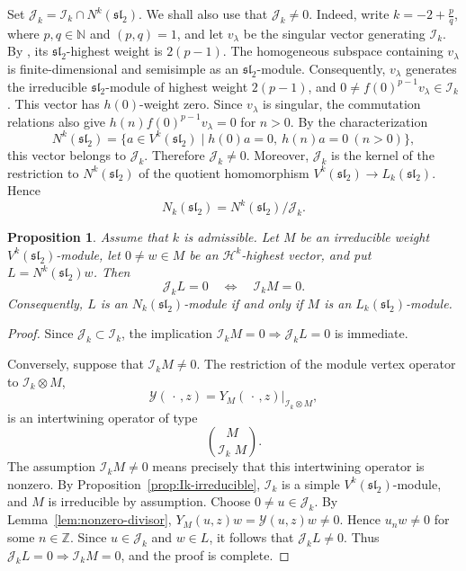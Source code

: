 \documentclass[11 pt]{amsart}
\newtheorem{proposition}{Proposition}
\theoremstyle{definition}
\theoremstyle{plain}
\begin{document}
Set $\mathcal J_k=\mathcal I_k\cap N^k(\mathfrak{sl}_2)$.
We shall also use that $\mathcal J_k\neq0$. Indeed, write
$k=-2+\frac{p}{q}$, where $p,q\in\mathbb N$ and $(p,q)=1$,
and let $v_\lambda$ be the singular vector generating $\mathcal I_k$. By
\cite[Theorem~5.3(1)]{AKMPP17}, its
$\mathfrak{sl}_2$-highest weight is $2(p-1)$. The homogeneous subspace
containing $v_\lambda$ is finite-dimensional and semisimple as an
$\mathfrak{sl}_2$-module. Consequently, $v_\lambda$ generates the
irreducible $\mathfrak{sl}_2$-module of highest weight $2(p-1)$, and
$0\neq f(0)^{p-1}v_\lambda\in\mathcal I_k$.
This vector has $h(0)$-weight zero. Since $v_\lambda$ is singular, the
commutation relations also give
$h(n)f(0)^{p-1}v_\lambda=0$ for $n>0$.
By the characterization
\[
  N^k(\mathfrak{sl}_2)
  =
  \{a\in V^k(\mathfrak{sl}_2)\mid
  h(0)a=0,\ h(n)a=0\ (n>0)\},
\]
this vector belongs to $\mathcal J_k$. Therefore $\mathcal J_k\neq0$.
Moreover, $\mathcal J_k$ is the kernel of the restriction to
$N^k(\mathfrak{sl}_2)$ of the quotient homomorphism
$V^k(\mathfrak{sl}_2)\to L_k(\mathfrak{sl}_2)$. Hence
\[
  N_k(\mathfrak{sl}_2)=N^k(\mathfrak{sl}_2)/\mathcal J_k.
\]

\par\medskip
\begin{proposition}\label{prop:factorization-criterion}
Assume that $k$ is admissible. Let $M$ be an irreducible weight
$V^k(\mathfrak{sl}_2)$-module, let
$0\neq w\in M$ be an $\mathcal H^k$-highest vector, and put
$L=N^k(\mathfrak{sl}_2)w$.
Then
\[
  \mathcal J_kL=0 \quad\Longleftrightarrow\quad \mathcal I_kM=0.
\]
Consequently, $L$ is an $N_k(\mathfrak{sl}_2)$-module if and only if
$M$ is an $L_k(\mathfrak{sl}_2)$-module.
\end{proposition}

\begin{proof}
Since $\mathcal J_k\subset\mathcal I_k$, the implication
$\mathcal I_kM=0\Longrightarrow\mathcal J_kL=0$
is immediate.

Conversely, suppose that $\mathcal I_kM\neq0$. The restriction of the module
vertex operator to $\mathcal I_k\otimes M$,
\[
  \mathcal Y(\,\cdot\,,z)
  =Y_M(\,\cdot\,,z)\big|_{\mathcal I_k\otimes M},
\]
is an intertwining operator of type
\[
  \binom{M}{\mathcal I_k\;M}.
\]
The assumption $\mathcal I_kM\neq0$ means precisely that this intertwining
operator is nonzero. By Proposition~\ref{prop:Ik-irreducible},
$\mathcal I_k$ is a
simple $V^k(\mathfrak{sl}_2)$-module, and $M$ is irreducible by
assumption. Choose $0\neq u\in\mathcal J_k$. By
Lemma~\ref{lem:nonzero-divisor},
$Y_M(u,z)w=\mathcal Y(u,z)w\neq0$.
Hence $u_nw\neq0$ for some $n\in\mathbb Z$. Since
$u\in\mathcal J_k$ and $w\in L$, it follows that
$\mathcal J_kL\neq0$. Thus
$\mathcal J_kL=0\Longrightarrow\mathcal I_kM=0$,
and the proof is complete.
\end{proof}
\end{document}
